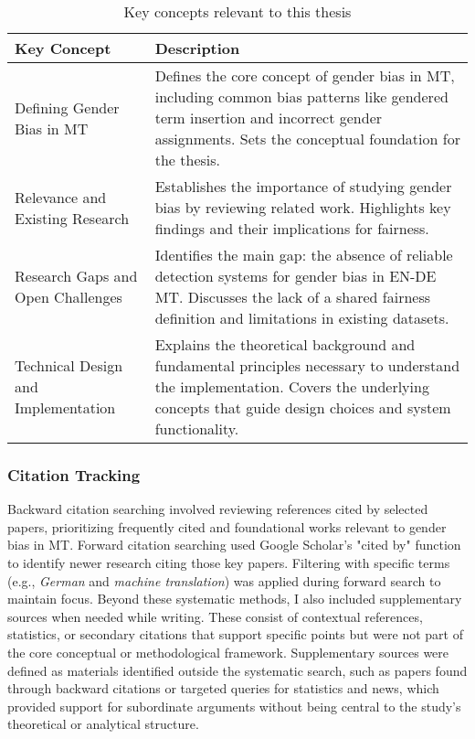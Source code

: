         \vspace{0.8em}
        \renewcommand{\arraystretch}{1.3}
            \begin{table}[ht!]
            \centering
            \begin{tabularx}{\textwidth}{>{\raggedright\arraybackslash}p{6.5cm}X}
            \toprule
            \textbf{Key Concept} & \textbf{Description} \\
            \midrule

            Defining Gender Bias in MT & Defines the core concept of gender bias in MT, including common bias patterns like gendered term insertion and incorrect gender assignments. Sets the conceptual foundation for the thesis. \\

            Relevance and Existing Research & Establishes the importance of studying gender bias by reviewing related work. Highlights key findings and their implications for fairness. \\

            Research Gaps and Open Challenges & Identifies the main gap: the absence of reliable detection systems for gender bias in EN-DE MT. Discusses the lack of a shared fairness definition and limitations in existing datasets. \\

            Technical Design and Implementation & Explains the theoretical background and fundamental principles necessary to understand the implementation. Covers the underlying concepts that guide design choices and system functionality. \\

            \bottomrule
            \end{tabularx}
            \caption{Key concepts relevant to this thesis}
            \label{tab:key-concepts}
        \end{table}


        \subsubsection{Citation Tracking}
        Backward citation searching involved reviewing references cited by selected papers, prioritizing frequently cited and foundational works relevant to gender bias in MT. Forward citation searching used Google Scholar's "cited by" function to identify newer research citing those key papers. Filtering with specific terms (e.g., \textit{German} and \textit{machine translation}) was applied during forward search to maintain focus. Beyond these systematic methods, I also included supplementary sources when needed while writing. These consist of contextual references, statistics, or secondary citations that support specific points but were not part of the core conceptual or methodological framework. Supplementary sources were defined as materials identified outside the systematic search, such as papers found through backward citations or targeted queries for statistics and news, which provided support for subordinate arguments without being central to the study's theoretical or analytical structure.


